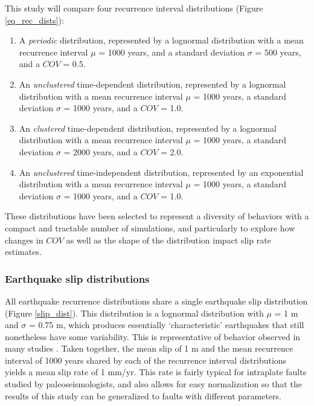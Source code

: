 \documentclass[se, manuscript]{copernicus}
\begin{document}
This study will compare four recurrence interval distributions (Figure
\ref{eq_rec_dists}):

\begin{enumerate}
\def\labelenumi{\arabic{enumi}.}
\item
  A \emph{periodic} distribution, represented by a lognormal
  distribution with a mean recurrence interval \(\mu\) = 1000 years, and
  a standard deviation \(\sigma\) = 500 years, and a \(COV\) = 0.5.
\item
  An \emph{unclustered} time-dependent distribution, represented by a
  lognormal distribution with a mean recurrence interval \(\mu\) = 1000
  years, a standard deviation \(\sigma\) = 1000 years, and a \(COV\) =
  1.0.
\item
  An \emph{clustered} time-dependent distribution, represented by a
  lognormal distribution with a mean recurrence interval \(\mu\) = 1000
  years, a standard deviation \(\sigma\) = 2000 years, and a \(COV\) =
  2.0.
\item
  An \emph{unclustered} time-independent distribution, represented by an
  exponential distribution with a mean recurrence interval \(\mu\) =
  1000 years, a standard deviation \(\sigma\) = 1000 years, and a
  \(COV\) = 1.0.
\end{enumerate}

These distributions have been selected to represent a diversity of
behaviors with a compact and tractable number of simulations, and
particularly to explore how changes in \(COV\) as well as the shape of
the distribution impact slip rate estimates.

\subsubsection{Earthquake slip
distributions}\label{earthquake-slip-distributions}

All earthquake recurrence distributions share a single earthquake slip
distribution (Figure \ref{slip_dist}). This distribution is a lognormal
distribution with \(\mu\) = 1 m and \(\sigma\) = 0.75 m, which produces
essentially `characteristic' earthquakes that still nonetheless have
some variability. This is representative of behavior observed in many
studies \citep[e.g.]{zielke_slip_2010,klinger_characteristic_2011,zielke_earthquake_2018}. Taken together, the mean slip of 1 m and the
mean recurrence interval of 1000 years shared by each of the recurrence
interval distributions yields a mean slip rate of 1 mm/yr. This rate is
fairly typical for intraplate faults studied by paleoseismologists, and
also allows for easy normalization so that the results of this study can
be generalized to faults with different parameters.
\end{document}
